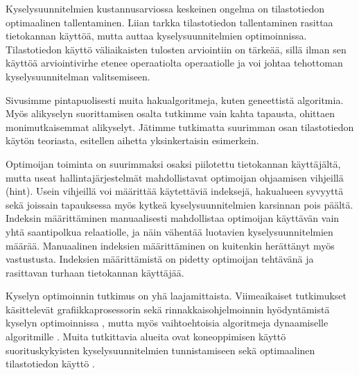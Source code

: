 \documentclass[finnish]{tktltiki2}
\theoremstyle{definition}
\theoremstyle{remark}
\begin{document}
Kyselysuunnitelmien kustannusarviossa keskeinen ongelma on tilastotiedon optimaalinen tallentaminen. Liian tarkka tilastotiedon tallentaminen rasittaa tietokannan käyttöä, mutta auttaa kyselysuunnitelmien optimoinnissa. Tilastotiedon käyttö väliaikaisten tulosten arviointiin on tärkeää, sillä ilman sen käyttöä arviointivirhe etenee operaatiolta operaatiolle ja voi johtaa tehottoman kyselysuunnitelman valitsemiseen.

Sivusimme pintapuolisesti muita hakualgoritmeja, kuten geneettistä algoritmia. Myös alikyselyn suorittamisen osalta tutkimme vain kahta tapausta, ohittaen monimutkaisemmat alikyselyt. Jätimme tutkimatta suurimman osan tilastotiedon käytön teoriasta, esitellen aihetta yksinkertaisin esimerkein. 


Optimoijan toiminta on suurimmaksi osaksi piilotettu tietokannan käyttäjältä, mutta useat hallintajärjestelmät mahdollistavat optimoijan ohjaamisen vihjeillä (hint). Usein vihjeillä voi määrittää käytettäviä indeksejä, hakualueen syvyyttä sekä joissain %
tapauksessa myös kytkeä kyselysuunnitelmien karsinnan pois päältä. Indeksin määrittäminen manuaalisesti mahdollistaa optimoijan käyttävän vain yhtä saantipolkua relaatiolle, ja näin vähentää luotavien kyselysuunnitelmien määrää. Manuaalinen indeksien määrittäminen on kuitenkin herättänyt myös vastustusta. Indeksien määrittämistä on pidetty optimoijan tehtävänä ja rasittavan turhaan tietokannan käyttäjää. 

Kyselyn optimoinnin tutkimus on yhä laajamittaista. Viimeaikaiset tutkimukset käsittelevät grafiikkaprosessorin sekä rinnakkaisohjelmoinnin hyödyntämistä kyselyn optimoinnissa \cite{heimel2012first, Wu:2011:QOM:2038916.2038928}, mutta myös vaihtoehtoisia algoritmeja dynaamiselle algoritmille \cite{sevincc2011evolutionary}. Muita tutkittavia alueita ovat koneoppimisen käyttö suorituskykyisten kyselysuunnitelmien tunnistamiseen \cite{borkar2012declarative} sekä optimaalinen tilastotiedon käyttö \cite{haas2009discovering}.

\newpage

%


\end{document}
